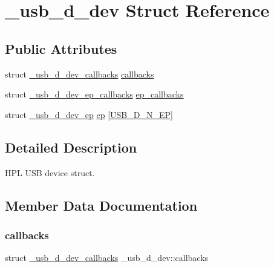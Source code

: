 \hypertarget{struct__usb__d__dev}{}\section{\+\_\+usb\+\_\+d\+\_\+dev Struct Reference}
\label{struct__usb__d__dev}
\subsection*{Public Attributes}
\begin{DoxyCompactItemize}
\item 
struct \hyperlink{struct__usb__d__dev__callbacks}{\+\_\+usb\+\_\+d\+\_\+dev\+\_\+callbacks} \hyperlink{struct__usb__d__dev_afd4e413fa19475be1bace6c2f9ec3605}{callbacks}
\item 
struct \hyperlink{struct__usb__d__dev__ep__callbacks}{\+\_\+usb\+\_\+d\+\_\+dev\+\_\+ep\+\_\+callbacks} \hyperlink{struct__usb__d__dev_ade523e67004729ba637734e248ba0c5d}{ep\+\_\+callbacks}
\item 
struct \hyperlink{struct__usb__d__dev__ep}{\+\_\+usb\+\_\+d\+\_\+dev\+\_\+ep} \hyperlink{struct__usb__d__dev_ab05786383c855842843a28f548b052ac}{ep} \mbox{[}\hyperlink{hpl__usb_8c_a12a5580ba5a2ca674cb271474ae5e819}{U\+S\+B\+\_\+\+D\+\_\+\+N\+\_\+\+EP}\mbox{]}
\end{DoxyCompactItemize}


\subsection{Detailed Description}
H\+PL U\+SB device struct. 

\subsection{Member Data Documentation}
\mbox{\label{struct__usb__d__dev_afd4e413fa19475be1bace6c2f9ec3605}} 
\subsubsection{\texorpdfstring{callbacks}{callbacks}}
{\footnotesize\ttfamily struct \hyperlink{struct__usb__d__dev__callbacks}{\+\_\+usb\+\_\+d\+\_\+dev\+\_\+callbacks} \+\_\+usb\+\_\+d\+\_\+dev\+::callbacks}


